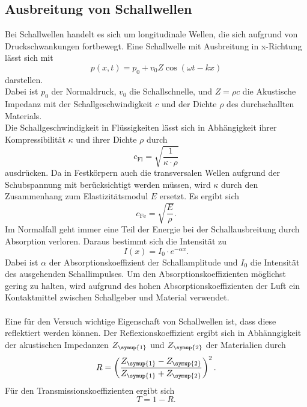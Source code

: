 \subsection{Ausbreitung von Schallwellen}
\label{sec:Schallwellen}
Bei Schallwellen handelt es sich um longitudinale Wellen, die sich aufgrund von Druckschwankungen fortbewegt.
Eine Schallwelle mit Ausbreitung in x-Richtung lässt sich mit
\begin{equation*}
    p(x, t) = p_0 + v_0 Z \cos{(\omega t - kx)}
\end{equation*}
darstellen.\\
Dabei ist $p_0$ der Normaldruck, $v_0$ die Schallschnelle, und $Z=\rho c$ die Akustische
Impedanz mit der Schallgeschwindigkeit $c$ und der Dichte $\rho$ des durchschallten Materials.\\
Die Schallgeschwindigkeit in Flüssigkeiten lässt sich in Abhängigkeit ihrer Kompressibilität $\kappa$ und ihrer
Dichte $\rho$ durch
\begin{equation*}
    c_{\mathrm{Fl}} = \sqrt{\frac{1}{\kappa \cdot \rho}}
\end{equation*}
ausdrücken. Da in Festkörpern auch die transversalen Wellen aufgrund der Schubspannung mit berücksichtigt werden
müssen, wird $\kappa$ durch den Zusammenhang zum Elastizitätsmodul $E$ ersetzt. Es ergibt sich
\begin{equation*}
    c_{\mathrm{Fe}} = \sqrt{\frac{E}{\rho}}.
\end{equation*}
Im Normalfall geht immer eine Teil der Energie bei der Schallausbreitung durch Absorption verloren. Daraus bestimmt
sich die Intensität zu
\begin{equation}
    \label{eqn:Dämpfung}
    I(x) = I_0 \cdot e^{-\alpha x}.
\end{equation}
Dabei ist $\alpha$ der Absorptionskoeffizient der Schallamplitude und $I_0$ die Intensität des ausgehenden 
Schallimpulses. Um den Absorptionskoeffizienten möglichst
gering zu halten, wird aufgrund des hohen Absorptionskoeffizienten der Luft ein Kontaktmittel zwischen Schallgeber
und Material verwendet.\\
\\
Eine für den Versuch wichtige Eigenschaft von Schallwellen ist, dass diese reflektiert werden können. Der Reflexionskoeffizient ergibt sich in Abhänngigkeit der
akustischen Impedanzen $Z_{\symup{1}}$ und $Z_{\symup{2}}$ der Materialien durch
\begin{equation*}
    R = \left(\frac{Z_{\symup{1}}- Z_{\symup{2}}}{Z_{\symup{1}}+Z_{\symup{2}}}\right)^2 .
\end{equation*}
Für den Transmissionskoeffizienten ergibt sich
\begin{equation*}
    T = 1 - R.
\end{equation*}

